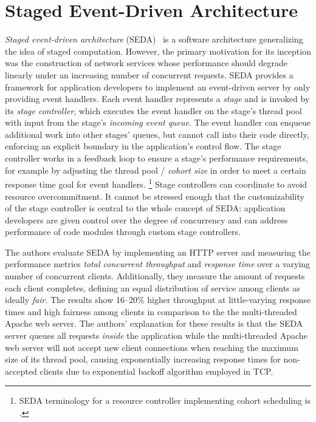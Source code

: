 \documentclass[12pt,a4paper]{book}
\begin{document}
\section{Staged Event-Driven Architecture}
\emph{Staged event-driven architecture} (SEDA)~\cite{seda} is a software architecture generalizing the idea of staged computation.
However, the primary motivation for its inception was the construction of network services whose performance should degrade linearly under an increasing number of concurrent requests.
SEDA provides a framework for application developers to implement an event-driven server by only providing event handlers.
Each event handler represents a \emph{stage} and is invoked by its \emph{stage controller}, which executes the event handler on the stage's thread pool with input from the stage's \emph{incoming event queue}.
The event handler can enqueue additional work into other stages' queues, but cannot call into their code directly, enforcing an explicit boundary in the application's control flow.
The stage controller works in a feedback loop to ensure a stage's performance requirements, for example by adjusting the thread pool / \emph{cohort size} in order to meet a certain response time goal for event handlers.%
\footnote{SEDA terminology for a resource controller implementing cohort scheduling is .}
Stage controllers can coordinate to avoid resource overcommitment.
It cannot be stressed enough that the customizability of the stage controller is central to the whole concept of SEDA:
application developers are given control over the degree of concurrency and can address performance of code modules through custom stage controllers.

The authors evaluate SEDA by implementing an HTTP server and measuring the performance metrics \emph{total concurrent throughput} and \emph{response time} over a varying number of concurrent clients.
Additionally, they measure the amount of requests each client completes, defining an equal distribution of service among clients as ideally \emph{fair}. %
The results show 16--20\% higher throughput at little-varying response times and high fairness among clients in comparison to the the multi-threaded Apache web server. %
The authors' explanation for these results is that the SEDA server queues all requests \emph{inside} the application while the multi-threaded Apache web server will not accept new client connections when reaching the maximum size of its thread pool, causing exponentially increasing response times for non-accepted clients due to exponential backoff algorithm employed in TCP.~\cite{seda}
\end{document}
